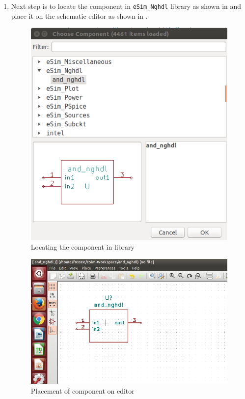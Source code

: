 \begin{enumerate}
    
    \pagebreak
    \item Next step is to locate the component in \texttt{eSim\_Nghdl} library as shown in  and place it on the schematic editor as shown in .
        \begin{figure}[!htp]
            \centering
            \includegraphics[width =\smfig]{./NGHDL/screen9.png} %
            \caption{Locating the component in library} 
            \label{screen9}
        \end{figure}


        \begin{figure}[!htp]
            \centering
            \includegraphics[width =\smfig]{./NGHDL/screen10.png}
            \caption{Placement of component on editor}
            \label{screen10}
        \end{figure}
\pagebreak


\end{enumerate}
